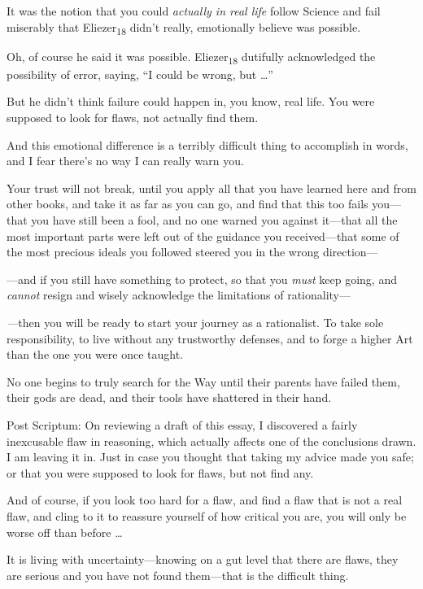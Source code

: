 {
 It was the notion that you could \textit{actually in real life}
follow Science and fail miserably that Eliezer\textsubscript{18}
didn't really, emotionally believe was possible.}

{
 Oh, of course he said it was possible. Eliezer\textsubscript{18}
dutifully acknowledged the possibility of error, saying,
``I could be wrong, but \ldots''}

{
 But he didn't think failure could happen in, you
know, real life. You were supposed to look for flaws, not actually find
them.}

{
 And this emotional difference is a terribly difficult thing to
accomplish in words, and I fear there's no way I can
really warn you.}

{
 Your trust will not break, until you apply all that you have
learned here and from other books, and take it as far as you can go,
and find that this too fails you---that you have still been a fool, and
no one warned you against it---that all the most important parts were
left out of the guidance you received---that some of the most precious
ideals you followed steered you in the wrong direction---}

{
 {}---and if you still have something to protect, so that you
\textit{must} keep going, and \textit{cannot} resign and wisely
acknowledge the limitations of rationality---}

{
 \textit{{}---}then you will be ready to start your journey as a
rationalist. To take sole responsibility, to live without any
trustworthy defenses, and to forge a higher Art than the one you were
once taught.}

{
 No one begins to truly search for the Way until their parents have
failed them, their gods are dead, and their tools have shattered in
their hand.}

{
 Post Scriptum: On reviewing a draft of this essay, I discovered a
fairly inexcusable flaw in reasoning, which actually affects one of the
conclusions drawn. I am leaving it in. Just in case you thought that
taking my advice made you safe; or that you were supposed to look for
flaws, but not find any.}

{
 And of course, if you look too hard for a flaw, and find a flaw
that is not a real flaw, and cling to it to reassure yourself of how
critical you are, you will only be worse off than before \ldots}

{
 It is living with uncertainty---knowing on a gut level that there
are flaws, they are serious and you have not found them---that is the
difficult thing.}


